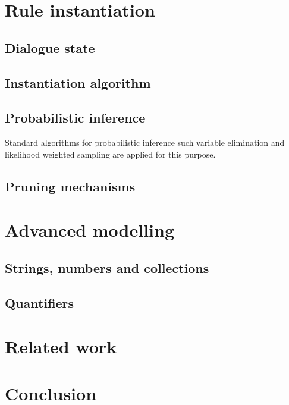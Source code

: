\section{Rule instantiation}

\subsection{Dialogue state}


\subsection{Instantiation algorithm}

\subsection{Probabilistic inference}

Standard algorithms for probabilistic inference such variable elimination \citep{ZhangP96} and likelihood weighted sampling \citep{FungC89} are applied for this purpose.


\subsection{Pruning mechanisms}

\section{Advanced modelling}

\subsection{Strings, numbers and collections}

\subsection{Quantifiers}

\section{Related work}

\section{Conclusion}

